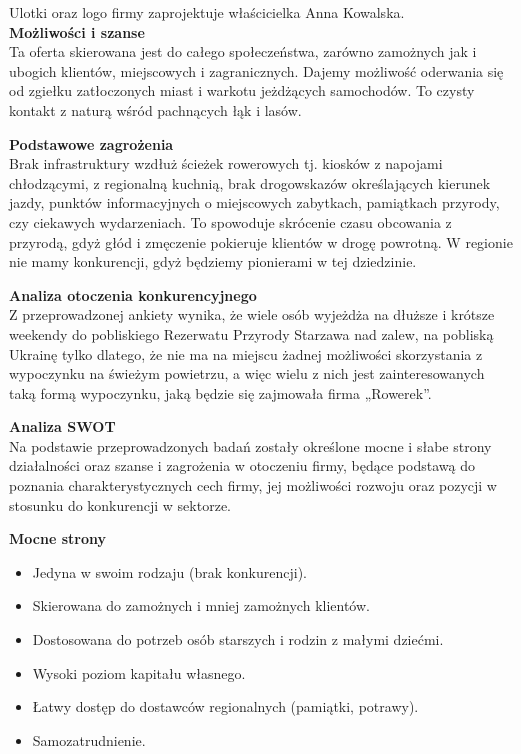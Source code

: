 \documentclass{sprawozdanie-agh}
\begin{document}
		Ulotki oraz logo firmy zaprojektuje właścicielka Anna Kowalska.\\
		\textbf{Możliwości i szanse}\\
		Ta oferta skierowana jest do całego społeczeństwa, zarówno zamożnych jak i ubogich klientów, miejscowych i zagranicznych. Dajemy możliwość oderwania się od zgiełku zatłoczonych miast i warkotu jeżdżących samochodów. To czysty kontakt z naturą wśród pachnących łąk i lasów.
		
		\textbf{Podstawowe zagrożenia}\\
		Brak infrastruktury wzdłuż ścieżek rowerowych tj. kiosków z napojami chłodzącymi, z regionalną kuchnią, brak drogowskazów określających kierunek jazdy, punktów informacyjnych o miejscowych zabytkach, pamiątkach przyrody, czy ciekawych wydarzeniach. To spowoduje skrócenie czasu obcowania z przyrodą, gdyż głód i zmęczenie pokieruje klientów w drogę powrotną. W regionie nie mamy konkurencji, gdyż będziemy pionierami w tej dziedzinie.
		
		\textbf{Analiza otoczenia konkurencyjnego}\\
		Z przeprowadzonej ankiety wynika, że wiele osób wyjeżdża na dłuższe i krótsze weekendy do pobliskiego Rezerwatu Przyrody Starzawa nad zalew, na pobliską Ukrainę tylko dlatego, że nie ma na miejscu żadnej możliwości skorzystania z wypoczynku na świeżym powietrzu, a więc wielu z nich jest zainteresowanych taką formą wypoczynku, jaką będzie się zajmowała firma „Rowerek”.
				
		\textbf{Analiza SWOT}\\
		Na podstawie przeprowadzonych badań zostały określone mocne i słabe strony działalności oraz szanse i zagrożenia w otoczeniu firmy, będące podstawą do poznania charakterystycznych cech firmy, jej możliwości rozwoju oraz pozycji w stosunku do konkurencji w sektorze.
		
		\textbf{Mocne strony}
		\begin{itemize}
			\item Jedyna w swoim rodzaju (brak konkurencji).
			\item Skierowana do zamożnych i mniej zamożnych klientów.
			\item Dostosowana do potrzeb osób starszych i rodzin z małymi dziećmi.
			\item Wysoki poziom kapitału własnego.
			\item Łatwy dostęp do dostawców regionalnych (pamiątki, potrawy).
			\item Samozatrudnienie.
		\end{itemize}
		
\end{document}
